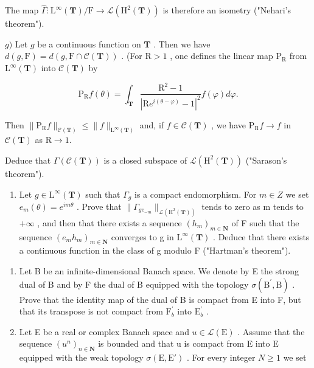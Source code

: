 The map \(\widehat{\Gamma}\colon\mathrm{L}^{\infty}(\mathbf{T})/\mathrm{F}\to\mathcal{L}(\mathrm{H}^{2}(\mathbf{T}))\) is therefore an isometry ("Nehari's theorem").

\(g)\) Let \(g\) be a continuous function on \(\mathbf{T}\) . Then we have \(d(g, \mathrm{F}) = d(g, \mathrm{F} \cap \mathcal{C}(\mathbf{T}))\) . (For \(\mathrm{R} > 1\) , one defines the linear map \(\mathrm{P}_{\mathrm{R}}\) from \(\mathrm{L}^{\infty}(\mathbf{T})\) into \(\mathcal{C}(\mathbf{T})\) by

\[
\mathrm{P} _ {\mathrm{R}} f (\theta) = \int_ {\mathbf {T}} \frac {\mathrm{R} ^ {2} - 1}{| \mathrm{R} e ^ {i (\theta - \varphi)} - 1 | ^ {2}} f (\varphi) d \varphi .
\]

Then \(\| \mathrm{P}_{\mathrm{R}}f\|_{\mathcal{C}(\mathbf{T})}\leqslant \| f\|_{\mathrm{L}^{\infty}(\mathbf{T})}\) and, if \(f\in \mathcal{C}(\mathbf{T})\) , we have \(\mathrm{P_R}f\to f\) in \(\mathcal{C}(\mathbf{T})\) as \(\mathrm{R}\rightarrow 1.\)

Deduce that \(\Gamma(\mathcal{C}(\mathbf{T}))\) is a closed subspace of \(\mathcal{L}(\mathrm{H}^{2}(\mathbf{T}))\) ("Sarason's theorem").

\begin{enumerate}
\def\labelenumi{\alph{enumi})}
\setcounter{enumi}{7}
\tightlist
\item
  Let \(g \in \mathrm{L}^{\infty}(\mathbf{T})\) such that \(\Gamma_{g}\) is a compact endomorphism. For \(m \in Z\) we set \(e_{m}(\theta) = e^{im\theta}\) . Prove that \(\|\Gamma_{ge_{-m}}\|_{\mathcal{L}(\mathrm{H}^{2}(\mathbf{T}))}\) tends to zero as m tends to \(+\infty\) , and then that there exists a sequence \((h_{m})_{m \in \mathbf{N}}\) of F such that the sequence \((e_{m}h_{m})_{m \in \mathbf{N}}\) converges to g in \(\mathrm{L}^{\infty}(\mathbf{T})\) . Deduce that there exists a continuous function in the class of g modulo F ("Hartman's theorem").
\end{enumerate}

\begin{enumerate}
\def\labelenumi{\arabic{enumi})}
\setcounter{enumi}{22}
\item
  Let B be an infinite-dimensional Banach space. We denote by E the strong dual of B and by F the dual of B equipped with the topology \(\sigma(\mathrm{B}^{\prime},\mathrm{B})\) . Prove that the identity map of the dual of B is compact from E into F, but that its transpose is not compact from \(\mathrm{F}_{b}^{\prime}\) into \(\mathrm{E}_{b}^{\prime}\) .
\item
  Let E be a real or complex Banach space and \(u \in \mathcal{L}(\mathrm{E})\) . Assume that the sequence \((u^{n})_{n \in \mathbf{N}}\) is bounded and that u is compact from E into E equipped with the weak topology \(\sigma(\mathrm{E}, \mathrm{E}')\) . For every integer \(N \geqslant 1\) we set
\end{enumerate}

